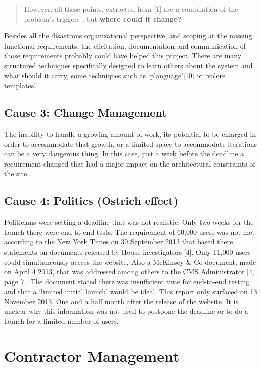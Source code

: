 \documentclass[]{article}
\begin{document}
\begin{quote}
However, all these points, extracted from {[}1{]} are a compilation of
the problem's triggers , but \textbf{where could it change?}
\end{quote}

Besides all the disastrous organizational perspective, and scoping at
the missing functional requirements, the elicitation, documentation and
communication of those requirements probably could have helped this
project. There are many structured techniques specifically designed to
learn others about the system and what should it carry, some techniques
such as `planguage'{[}10{]} or `volere templates'.

\subsection{Cause 3: Change Management}\label{cause-3-change-management}

The inability to handle a growing amount of work, its potential to be
enlarged in order to accommodate that growth, or a limited space to
accommodate iterations can be a very dangerous thing. In this case, just
a week before the deadline a requirement changed that had a major impact
on the architectural constraints of the site.

\subsection{Cause 4: Politics (Ostrich
effect)}\label{cause-4-politics-ostrich-effect}

Politicians were setting a deadline that was not realistic. Only two
weeks for the launch there were end-to-end tests. The requirement of
60,000 users was not met according to the New York Times on 30 September
2013 that based there statements on documents released by House
investigators {[}4{]}. Only 11,000 users could simultaneously access the
website. Also a McKinsey \& Co document, made on April 4 2013, that was
addressed among others to the CMS Administrator {[}4, page 7{]}. The
document stated there was insufficient time for end-to-end testing and
that a `limited initial launch' would be ideal. This report only
surfaced on 13 November 2013. One and a half month after the release of
the website. It is unclear why this information was not used to postpone
the deadline or to do a launch for a limited number of users.

\section{Contractor Management}\label{contractor-management}
\end{document}
